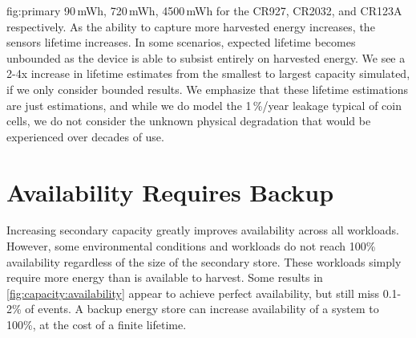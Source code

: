 \begin{definefigure*}{fig:primary}
{    90\,mWh, 720\,mWh, 4500\,mWh for the CR927, CR2032, and CR123A respectively.
    As the ability to capture
    more harvested energy increases, the sensors lifetime increases.
    In some scenarios, expected
    lifetime becomes unbounded as the device is able to subsist entirely on harvested
    energy.
    We see a 2-4x increase in lifetime estimates from the smallest to largest
    capacity simulated, if we only consider bounded results.
    We emphasize that
    these lifetime estimations are
    just estimations, and while we do model the 1\,\%/year leakage
    typical of coin cells, we do not consider the unknown
    physical degradation that would be experienced over decades of use.
    }
\end{definefigure*}

\section{Availability Requires Backup}
\label{sec:primary:availability}

Increasing secondary capacity greatly improves
availability across all workloads.
However, some environmental
conditions and workloads do not reach 100\% availability regardless of the size
of the secondary store.
These workloads simply require more energy
than is available to harvest.
Some results in \cref{fig:capacity:availability}
appear to achieve perfect availability, but still miss 0.1-2\% of events.
A backup energy store can increase availability of a system
to 100\%, at the cost of a finite lifetime.


